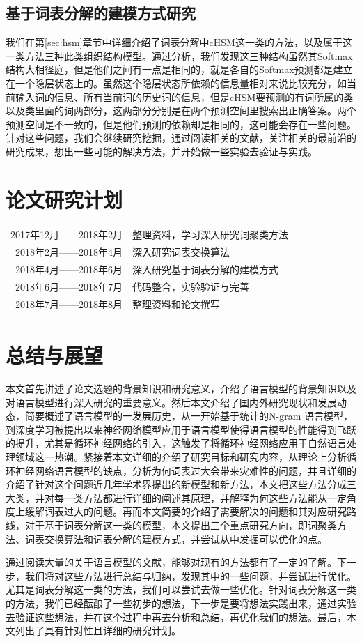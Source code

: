 \documentclass[12pt,a4paper]{article}
\begin{document}
\subsection{基于词表分解的建模方式研究}
我们在第\ref{sec:hsm}章节中详细介绍了词表分解中cHSM这一类的方法，以及属于这一类方法三种此类组织结构模型。通过分析，我们发现这三种结构虽然其Softmax结构大相径庭，但是他们之间有一点是相同的，就是各自的Softmax预测都是建立在一个隐层状态上的。虽然这个隐层状态所依赖的信息量相对来说比较充分，如当前输入词的信息、所有当前词的历史词的信息，但是cHSM要预测的有词所属的类以及类里面的词两部分，这两部分分别是在两个预测空间里搜索出正确答案。两个预测空间是不一致的，但是他们预测的依赖却是相同的，这可能会存在一些问题。针对这些问题，我们会继续研究挖掘，通过阅读相关的文献，关注相关的最前沿的研究成果，想出一些可能的解决方法，并开始做一些实验去验证与实践。

\section{论文研究计划}
\begin{tabular}{r|l}
  2017年12月——2018年2月& 整理资料，学习深入研究词聚类方法 \\
  2018年2月——2018年4月 & 深入研究词表交换算法 \\
  2018年4月——2018年6月 & 深入研究基于词表分解的建模方式 \\
  2018年6月——2018年7月 & 代码整合，实验验证与完善 \\
  2018年7月——2018年8月 & 整理资料和论文撰写
\end{tabular}


\section{总结与展望}
本文首先讲述了论文选题的背景知识和研究意义，介绍了语言模型的背景知识以及对语言模型进行深入研究的重要意义。然后本文介绍了国内外研究现状和发展动态，简要概述了语言模型的一发展历史，从一开始基于统计的N-gram 语言模型，到深度学习被提出以来神经网络模型应用于语言模型使得语言模型的性能得到飞跃的提升，尤其是循环神经网络的引入，这触发了将循环神经网络应用于自然语言处理领域这一热潮。紧接着本文详细的介绍了研究目标和研究内容，从理论上分析循环神经网络语言模型的缺点，分析为何词表过大会带来灾难性的问题，并且详细的介绍了针对这个问题近几年学术界提出的新模型和新方法，本文把这些方法分成三大类，并对每一类方法都进行详细的阐述其原理，并解释为何这些方法能从一定角度上缓解词表过大的问题。再而本文简要的介绍了需要解决的问题和其对应研究路线，对于基于词表分解这一类的模型，本文提出三个重点研究方向，即词聚类方法、词表交换算法和词表分解的建模方式，并尝试从中发掘可以优化的点。

通过阅读大量的关于语言模型的文献，能够对现有的方法都有了一定的了解。下一步，我们将对这些方法进行总结与归纳，发现其中的一些问题，并尝试进行优化。尤其是词表分解这一类的方法，我们可以尝试去做一些优化。针对词表分解这一类的方法，我们已经酝酿了一些初步的想法，下一步是要将想法实践出来，通过实验去验证这些想法，并在这个过程中再去分析和总结，再优化我们的想法。最后，本文列出了具有针对性且详细的研究计划。
\newpage
{}

\end{document}
